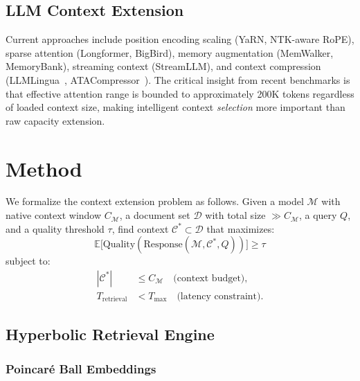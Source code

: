 \documentclass[11pt,letterpaper]{article}
\begin{document}
\subsection{LLM Context Extension}

Current approaches include position encoding scaling (YaRN, NTK-aware
RoPE), sparse attention (Longformer, BigBird), memory augmentation
(MemWalker, MemoryBank), streaming context (StreamLLM), and context
compression (LLMLingua~\citep{longllmlingua2024},
ATACompressor~\citep{atacompressor2026}).  The critical insight from recent
benchmarks is that effective attention range is bounded to approximately
200K tokens regardless of loaded context size, making intelligent context
\emph{selection} more important than raw capacity extension.


\section{Method}
\label{sec:method}

We formalize the context extension problem as follows.
Given a model $\mathcal{M}$ with native context window $C_{\mathcal{M}}$,
a document set $\mathcal{D}$ with total size $\gg C_{\mathcal{M}}$,
a query $Q$, and a quality threshold $\tau$, find context
$\mathcal{C}^{*} \subset \mathcal{D}$ that maximizes:
\begin{equation}
  \mathbb{E}\!\bigl[\mathrm{Quality}(\mathrm{Response}(\mathcal{M},
    \mathcal{C}^{*}, Q))\bigr] \geq \tau
  \label{eq:objective}
\end{equation}
subject to:
\begin{align}
  |\mathcal{C}^{*}| &\leq C_{\mathcal{M}}
    \quad\text{(context budget)},
  \label{eq:budget} \\
  T_{\mathrm{retrieval}} &< T_{\max}
    \quad\text{(latency constraint)}.
  \label{eq:latency}
\end{align}

\subsection{Hyperbolic Retrieval Engine}
\label{sec:hyperbolic}

\subsubsection{Poincar\'{e} Ball Embeddings}
\end{document}
